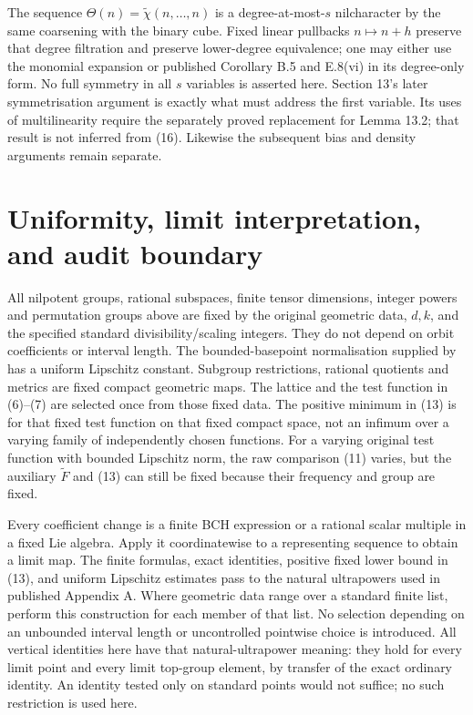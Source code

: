 \documentclass[11pt]{article}
\begin{document}
The sequence $\Theta(n)=\widetilde\chi(n,\ldots,n)$ is a degree-at-most-$s$
nilcharacter by the same coarsening with the binary cube. Fixed linear
pullbacks $n\mapsto n+h$ preserve that degree filtration and preserve
lower-degree equivalence; one may either use the monomial expansion
or published Corollary B.5 and E.8(vi) in its degree-only form.
No full symmetry in all $s$ variables is asserted here. Section 13's
later symmetrisation argument is exactly what must address the first
variable. Its uses of multilinearity require the separately proved
replacement for Lemma 13.2; that result is not inferred from (16).
Likewise the subsequent bias and density arguments remain separate.

\section{Uniformity, limit interpretation, and audit boundary}\label{sec:limits}
All nilpotent groups, rational subspaces, finite tensor dimensions,
integer powers and permutation groups above are fixed by the original
geometric data, $d,k$, and the specified standard divisibility/scaling
integers. They do not depend on orbit coefficients or interval length.
The bounded-basepoint normalisation supplied by \cite{TAUT} has a uniform
Lipschitz constant. Subgroup restrictions, rational quotients and metrics
are fixed compact geometric maps. The lattice and the test function in
(6)--(7) are selected once from those fixed data. The positive minimum
in (13) is for that fixed test function on that fixed compact space,
not an infimum over a varying family of independently chosen functions.
For a varying original test function with bounded Lipschitz norm, the
raw comparison (11) varies, but the auxiliary $\widetilde F$ and (13)
can still be fixed because their frequency and group are fixed.

Every coefficient change is a finite BCH expression or a rational scalar
multiple in a fixed Lie algebra. Apply it coordinatewise to a representing
sequence to obtain a limit map. The finite formulas, exact identities,
positive fixed lower bound in (13), and uniform Lipschitz estimates pass
to the natural ultrapowers used in published Appendix A. Where geometric
data range over a standard finite list, perform this construction for
each member of that list. No selection depending on an unbounded interval
length or uncontrolled pointwise choice is introduced.
All vertical identities here have that natural-ultrapower meaning: they
hold for every limit point and every limit top-group element, by transfer
of the exact ordinary identity. An identity tested only on standard
points would not suffice; no such restriction is used here.
\end{document}
